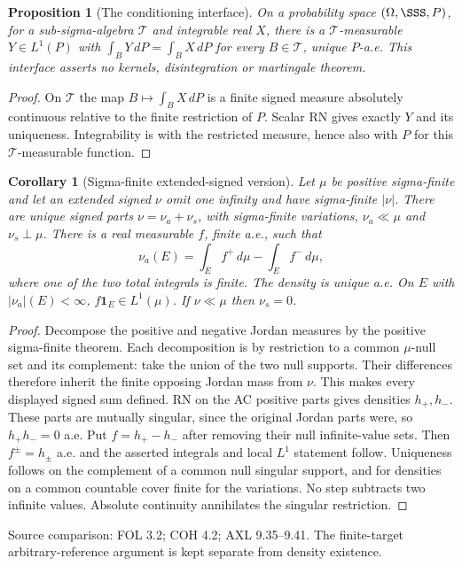 \documentclass[11pt,oneside,openany]{book}
\newtheorem{proposition}[theorem]{Proposition}
\newtheorem{corollary}[theorem]{Corollary}
\theoremstyle{definition}
\theoremstyle{remark}
\newcommand{\one}{\mathbf1}\newcommand{\ind}[1]{\mathbf1_{#1}}
\newcommand{\family}[1]{}
\newcommand{\source}[1]{\par\begingroup\small\sffamily\color{black!65}Source comparison: #1\par\endgroup}
\begin{document}
\begin{proposition}[The conditioning interface]\family{D11.15.conditioning_route}\label{d11:15:conditioning-route}
On a probability space $(\Omega,\SSS,P)$, for a sub-sigma-algebra
$\mathcal T$ and integrable real $X$, there is a $\mathcal T$-measurable
$Y\in L^1(P)$ with $\int_B Y\,dP=\int_BX\,dP$ for every $B\in\mathcal T$,
unique $P$-a.e. This interface asserts no kernels, disintegration or
martingale theorem.
\end{proposition}
\begin{proof}
On $\mathcal T$ the map $B\mapsto\int_BX\,dP$ is a finite signed measure
absolutely continuous relative to the finite restriction of $P$. Scalar RN
gives exactly $Y$ and its uniqueness. Integrability is with the restricted
measure, hence also with $P$ for this $\mathcal T$-measurable function.
\end{proof}

\begin{corollary}[Sigma-finite extended-signed version]\family{D11.15.lebesgue_rn_sigmafinite_signed}\label{d11:15:lebesgue-rn-sigmafinite-signed}
Let $\mu$ be positive sigma-finite and let an extended signed $\nu$ omit
one infinity and have sigma-finite $|\nu|$. There are unique signed parts
$\nu=\nu_a+\nu_s$, with sigma-finite variations, $\nu_a\ll\mu$ and
$\nu_s\perp\mu$. There is a real measurable $f$, finite a.e., such that
\[
 \nu_a(E)=\int_E f^+\,d\mu-\int_E f^-\,d\mu,
\]
where one of the two total integrals is finite. The density is unique a.e.
On $E$ with $|\nu_a|(E)<\infty$, $f\one_E\in L^1(\mu)$.
If $\nu\ll\mu$ then $\nu_s=0$.
\end{corollary}
\begin{proof}
Decompose the positive and negative Jordan measures by the positive
sigma-finite theorem. Each decomposition is by restriction to a common
$\mu$-null set and its complement: take the union of the two null supports.
Their differences therefore inherit the finite opposing Jordan mass from
$\nu$. This makes every displayed signed sum defined. RN on the AC
positive parts gives densities $h_+,h_-$. These parts are mutually singular,
since the original Jordan parts were, so $h_+h_-=0$ a.e. Put
$f=h_+-h_-$ after removing their null infinite-value sets. Then
$f^\pm=h_\pm$ a.e. and the asserted integrals and local $L^1$ statement
follow. Uniqueness follows on the complement of a common null singular
support, and for densities on a common countable cover finite for the
variations. No step subtracts two infinite values. Absolute continuity
annihilates the singular restriction.
\end{proof}
\source{FOL 3.2; COH 4.2; AXL 9.35--9.41. The finite-target arbitrary-reference argument is kept separate from density existence.}
\end{document}
